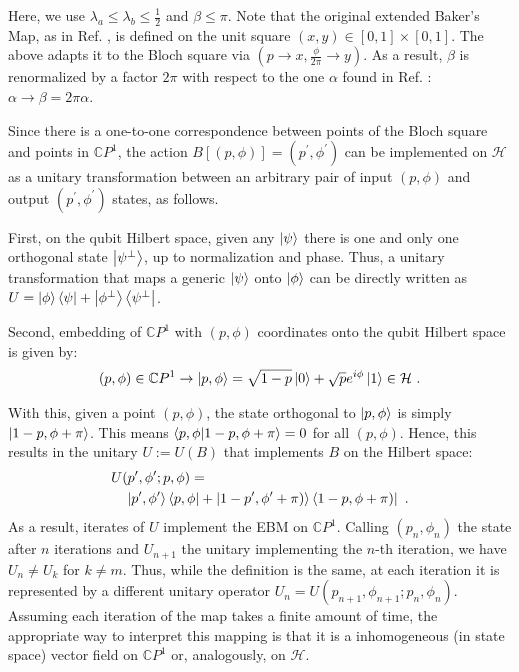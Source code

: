 \documentclass[draft,nofootinbib,pre,twocolumn,showkeys,superscriptaddress,preprintnumbers,floatfix]{revtex4-1}
\newcommand{\1}{\mathbbm{1}}
\begin{document}
Here, we use $\lambda_a \leq \lambda_b \leq \frac{1}{2}$ and $\beta \leq \pi$.
Note that the original extended Baker's Map, as in Ref. \cite{Farm83}, is
defined on the unit square $(x,y)\in [0,1]\times [0,1]$. The above adapts it to
the Bloch square via $(p\to x, \frac{\phi}{2\pi} \to y)$. As a result, $\beta$
is renormalized by a factor $2\pi$ with respect to the one $\alpha$ found in
Ref. \cite{Farm83}: $\alpha \to \beta = 2\pi \alpha$.

Since there is a one-to-one correspondence between points of the Bloch square
and points in $\mathbb{C}P^1$, the action $B[(p,\phi)] =
(p^\prime,\phi^\prime)$ can be implemented on $\mathcal{H}$ as a unitary
transformation between an arbitrary pair of input $(p,\phi)$ and output $(p^\prime,\phi^\prime)$ 
states, as follows.

First, on the qubit Hilbert space, given any $\ket{\psi}$ there is one and only one 
orthogonal state $\ket{\psi^{\perp}}$, up to normalization and phase. 
Thus, a unitary transformation that maps a generic $\ket{\psi}$ onto $\ket{\phi}$ 
can be directly written as $U = \ket{\phi}\bra{\psi}+\ket{\phi^{\perp}}\bra{\psi^{\perp}}$.

Second, embedding of $\mathbb{C}P^1$ with $(p,\phi)$ coordinates onto the qubit
Hilbert space is given by:
\begin{align*}
(p,\phi) \in \mathbb{C}P^1 \to \ket{p,\phi}
  = \sqrt{1-p}\ket{0}+ \sqrt{p}e^{i\phi}\ket{1} \in \mathcal{H}
  ~.
\end{align*}

With this, given a point $(p,\phi)$, the state orthogonal to
$\ket{p,\phi}$ is simply $\ket{1-p,\phi+\pi}$. This means
$\braket{p,\phi}{1-p,\phi+\pi}= 0$ for all $(p,\phi)$. Hence, this
results in the unitary $U := U(B)$ that implements $B$ on the 
Hilbert space: 
\begin{align*}
&U(p^\prime,\phi^\prime;p,\phi) =\\
&\quad \ket{p^\prime,\phi^\prime}\bra{p,\phi}
  + \ket{1-p^\prime,\phi^\prime+\pi)} \bra{1-p,\phi+\pi)}
  ~.
\end{align*}
As a result, iterates of $U$ implement the EBM on $\mathbb{C}P^1$. Calling
$(p_n,\phi_n)$ the state after $n$ iterations and $U_{n+1}$ the unitary
implementing the $n$-th iteration, we have $U_n \neq U_k$ for $k\neq m$. Thus,
while the definition is the same, at each iteration it is represented by a
different unitary operator $U_n=U(p_{n+1},\phi_{n+1};p_n,\phi_n)$. Assuming
each iteration of the map takes a finite amount of time, the appropriate way to
interpret this mapping is that it is a inhomogeneous (in state space) vector
field on $\mathbb{C}P^1$ or, analogously, on $\mathcal{H}$.
\end{document}
